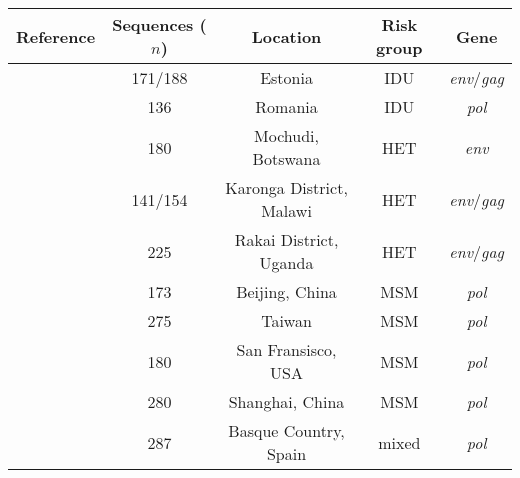 \begin{tabular}{ccccc}
  Reference & Sequences ($n$) & Location & Risk group & Gene \\
  \hline
  \textcite{zetterberg2004two} & 171/188 & Estonia & IDU & \textit{env}/\textit{gag} \\
  \textcite{niculescu2015recent} & 136 & Romania & IDU & \textit{pol} \\
  \textcite{novitsky2013phylogenetic} & \multirow{2}{*}{180} &
  \multirow{2}{*}{Mochudi, Botswana} & \multirow{2}{*}{HET} &
  \multirow{2}{*}{\textit{env}} \\ \textcite{novitsky2014impact} \\
  \textcite{mccormack2002early} & 141/154 & Karonga District, Malawi & HET & \textit{env}/\textit{gag} \\
  \textcite{grabowski2014role} & 225 & Rakai District, Uganda & HET & \textit{env}/\textit{gag} \\
  \textcite{wang2015targeting} & 173 & Beijing, China & MSM & \textit{pol} \\
  \textcite{kao2011surveillance} & 275 & Taiwan & MSM & \textit{pol} \\
  \textcite{little2014using} & 180 & San Fransisco, USA & MSM & \textit{pol} \\
  \textcite{li2015hiv} & 280 & Shanghai, China & MSM & \textit{pol} \\
  \textcite{cuevas2009hiv} & 287 & Basque Country, Spain & mixed & \textit{pol} \\
  \hline
\end{tabular}
